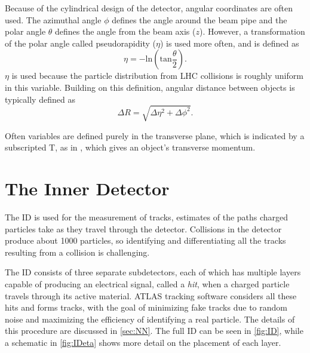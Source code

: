 Because of the cylindrical design of the detector, angular coordinates are often used. The azimuthal angle $\phi$ defines the angle around the beam pipe and the polar angle $\theta$ defines the angle from the beam axis ($z$). However, a transformation of the polar angle called pseudorapidity ($\eta$) is used more often, and is defined as 
%
\begin{equation}
\eta = - \mathrm{ln} ( \mathrm{tan} \frac{\theta}{2} ). 
\end{equation}
%
$\eta$ is used because the particle distribution from \ac{LHC} collisions is roughly uniform in this variable. Building on this definition, angular distance between objects is typically defined as
%
\begin{equation}
\Delta R = \sqrt{\Delta\eta^2 + \Delta\phi^2}. 
\end{equation}

Often variables are defined purely in the transverse plane, which is indicated by a subscripted T, as in \pt, which gives an object's transverse momentum. 


\section{The Inner Detector}
\label{sec:ID}

The \acf{ID} is used for the measurement of tracks, estimates of the paths charged particles take as they travel through the detector. Collisions in the detector produce about 1000 particles, so identifying and differentiating all the tracks resulting from a collision is challenging. 

The \ac{ID} consists of three separate subdetectors, each of which has multiple layers capable of producing an electrical signal, called a \textit{hit}, when a charged particle travels through its active material. \ac{ATLAS} tracking software considers all these hits and forms tracks, with the goal of minimizing fake tracks due to random noise and maximizing the efficiency of identifying a real particle. The details of this procedure are discussed in \autoref{sec:NN}. The full \ac{ID} can be seen in \autoref{fig:ID}, while a schematic in \autoref{fig:IDeta} shows more detail on the placement of each layer.

